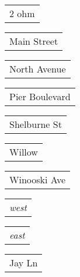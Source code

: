 \documentclass{book}
\begin{document}
\stopmpxshipout
\mpxshipout%
{\small \renewcommand{\arraystretch}{.9}
                \circuitfont\begin{tabular}[b]{@{}c}
                   $2$ ohm 
	        \end{tabular}}%
\stopmpxshipout
\mpxshipout%
{\small \renewcommand{\arraystretch}{.9}
              \circuitfont\begin{tabular}[b]{@{}c@{}}
                  Main Street     
              \end{tabular}}%
\stopmpxshipout
\mpxshipout%
{\small \renewcommand{\arraystretch}{.9}
              \circuitfont\begin{tabular}{@{}l@{}}
                  North Avenue   
              \end{tabular}}%
\stopmpxshipout
\mpxshipout%
{\small \renewcommand{\arraystretch}{.9}
              \circuitfont\begin{tabular}{@{}l@{}}
                  Pier Boulevard   
              \end{tabular}}%
\stopmpxshipout
\mpxshipout%
{\small \renewcommand{\arraystretch}{.9}
              \circuitfont\begin{tabular}[b]{@{}c@{}}
                  Shelburne St     
              \end{tabular}}%
\stopmpxshipout
\mpxshipout%
{\small \renewcommand{\arraystretch}{.9}
              \circuitfont\begin{tabular}[t]{@{}r@{}}
                  Willow     
              \end{tabular}}%
\stopmpxshipout
\mpxshipout%
{\small \renewcommand{\arraystretch}{.9}
              \circuitfont\begin{tabular}[t]{@{}c@{}}
                  Winooski Ave     
              \end{tabular}}%
\stopmpxshipout
\mpxshipout%
{\small \renewcommand{\arraystretch}{.9}
              \begin{tabular}[t]{@{}r@{}}
                  \textit{west}     
              \end{tabular}}%
\stopmpxshipout
\mpxshipout%
{\small \renewcommand{\arraystretch}{.9}
              \begin{tabular}{@{}l@{}}
                  \textit{east}     
              \end{tabular}}%
\stopmpxshipout
\mpxshipout%
{\small \renewcommand{\arraystretch}{.9}
              \circuitfont\begin{tabular}{@{}r@{}}
                  Jay Ln     
              \end{tabular}}%
\end{document}
